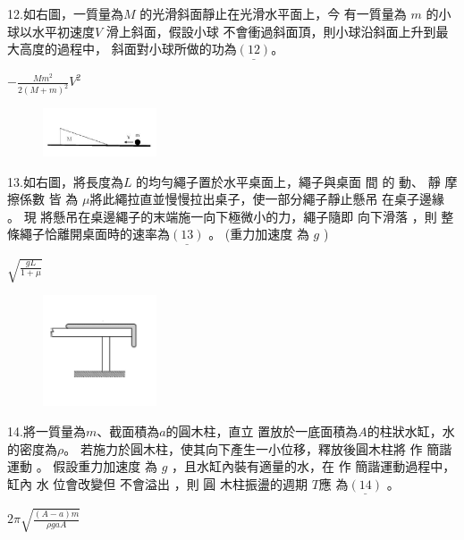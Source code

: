 \documentclass[cn,10pt,math=newtx]{elegantbook}
\begin{document}
\begin{example}
   12.如右圖，一質量為$ M$ 的光滑斜面靜止在光滑水平面上，今
有一質量為 $m$ 的小球以水平初速度$V$ 滑上斜面，假設小球
不會衝過斜面頂，則小球沿斜面上升到最大高度的過程中，
斜面對小球所做的功為$\underline{(12)}$。\\
    \rightline{[文華高中教甄109]}
\end{example}
\begin{solution}
    $- \frac{Mm^2}{2(M+m)^2} V^2$
\end{solution}
\begin{figure}[htbp]
    \flushright
    \includegraphics[width=0.3\textwidth]{image/109文華12.png}
  \end{figure}
\newpage


\begin{example}
  13.如右圖，將長度為$L$ 的均勻繩子置於水平桌面上，繩子與桌面 間 的 動、
靜 摩擦係數 皆 為 $\mu$將此繩拉直並慢慢拉出桌子，使一部分繩子靜止懸吊
在桌子邊緣 。 現 將懸吊在桌邊繩子的末端施一向下極微小的力，繩子隨即
向下滑落 ，則 整條繩子恰離開桌面時的速率為$\underline{(13)}$ 。 (重力加速度
為 $g$ ) \\
    \rightline{[文華高中教甄109]}
\end{example}
\begin{solution}
    $\sqrt{\frac{gL} {1+\mu}}$
\end{solution}
\begin{figure}[htbp]
    \flushright
    \includegraphics[width=0.3\textwidth]{image/109文華13.png}
  \end{figure}
\newpage


\begin{example}
   14.將一質量為$m$、截面積為$a$的圓木柱，直立 置放於一底面積為$A$的柱狀水缸，水的密度為$\rho$。
若施力於圓木柱，使其向下產生一小位移，釋放後圓木柱將 作 簡諧運動 。 假設重力加速度
為 $g$ ，且水缸內裝有適量的水，在 作 簡諧運動過程中， 缸內 水 位會改變但 不會溢出 ，則 圓
木柱振盪的週期 $T$應 為$\underline{(14)}$ 。\\
    \rightline{[文華高中教甄109]}
\end{example}
\begin{solution}
    $2\pi \sqrt{\frac{(A-a)m}{\rho gaA}}$ 
\end{solution}
\end{document}
